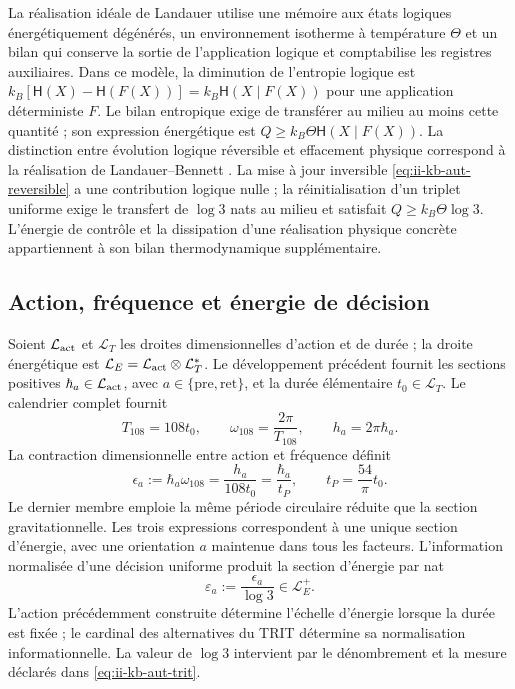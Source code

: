 La réalisation idéale de Landauer utilise une mémoire aux états logiques
énergétiquement dégénérés, un environnement isotherme à température \(\Theta\)
et un bilan qui conserve la sortie de l'application logique et comptabilise les
registres auxiliaires. Dans ce modèle, la diminution de l'entropie logique est
\(k_B[\mathsf H(X)-\mathsf H(F(X))]
=k_B\mathsf H(X\mid F(X))\) pour une application déterministe \(F\).
Le bilan entropique exige de transférer au milieu au moins cette quantité ;
son expression énergétique est \(Q\geq k_B\Theta\mathsf H(X\mid F(X))\).
La distinction entre évolution logique réversible et effacement physique
correspond à la réalisation de Landauer--Bennett \cite{bennett2003}.
La mise à jour inversible
\eqref{eq:ii-kb-aut-reversible} a une contribution logique nulle ; la
réinitialisation d'un triplet uniforme exige le transfert de \(\log3\) nats
au milieu et satisfait \(Q\geq k_B\Theta\log3\).
L'énergie de contrôle et la dissipation d'une réalisation physique
concrète appartiennent à son bilan thermodynamique supplémentaire.

\subsection{Action, fréquence et énergie de décision}

Soient \(\mathcal L_{\rm act}\) et \(\mathcal L_T\) les droites
dimensionnelles d'action et de durée ; la droite énergétique est
\(\mathcal L_E=\mathcal L_{\rm act}\otimes\mathcal L_T^*\).
Le développement précédent fournit les sections positives
\(\hbar_a\in\mathcal L_{\rm act}\), avec
\(a\in\{\mathrm{pre},\mathrm{ret}\}\), et la durée élémentaire
\(t_0\in\mathcal L_T\). Le calendrier complet fournit
\[
 T_{108}=108t_0,\qquad
 \omega_{108}=\frac{2\pi}{T_{108}},\qquad
 h_a=2\pi\hbar_a.
\]
La contraction dimensionnelle entre action et fréquence définit
\begin{equation}
 \epsilon_a:=\hbar_a\omega_{108}
 =\frac{h_a}{108t_0}
 =\frac{\hbar_a}{t_P},\qquad
 t_P=\frac{54}{\pi}t_0.
 \label{eq:ii-kb-aut-energia}
\end{equation}
Le dernier membre emploie la même période circulaire réduite que la section gravitationnelle. Les trois expressions correspondent à une unique section d'énergie, avec une orientation \(a\) maintenue dans tous les facteurs. L'information normalisée d'une décision uniforme produit la section d'énergie par nat
\begin{equation}
 \varepsilon_a:=\frac{\epsilon_a}{\log3}\in\mathcal L_E^+.
 \label{eq:ii-kb-aut-energia-nat}
\end{equation}
L'action précédemment construite détermine l'échelle d'énergie lorsque
la durée est fixée ; le cardinal des alternatives du TRIT détermine sa
normalisation informationnelle. La valeur de \(\log3\) intervient par le
dénombrement et la mesure déclarés dans \eqref{eq:ii-kb-aut-trit}.

